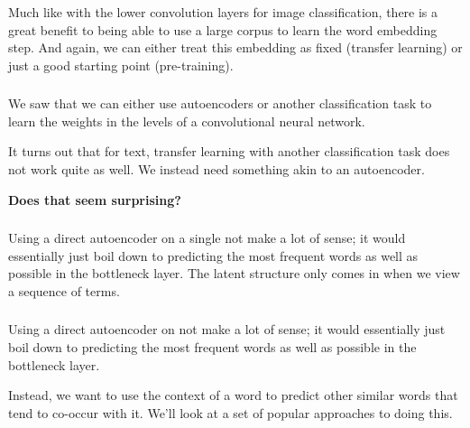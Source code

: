 \documentclass[xetex,mathserif,serif,aspectratio=169]{beamer}
\begin{document}
\begin{frame}[fragile] \frametitle{} \oldB \small


Much like with the lower convolution layers for image classification,
there is a great benefit to being able to use a large corpus to
learn the word embedding step. And again, we can either treat this
embedding as fixed (transfer learning) or just a good starting point
(pre-training).

\end{frame}

\begin{frame}[fragile] \frametitle{} \oldB \small


We saw that we can either use autoencoders or another classification
task to learn the weights in the levels of a convolutional neural
network.

It turns out that for text, transfer learning with another
classification task does not work quite as well. We instead need
something akin to an autoencoder.

\pause \textbf{Does that seem surprising?}

\end{frame}

\begin{frame}[fragile] \frametitle{} \oldB \small


Using a direct autoencoder on a single not make a lot of sense; it would
essentially just boil down to predicting the most frequent words as
well as possible in the bottleneck layer. The latent structure only
comes in when we view a sequence of terms.

\end{frame}

\begin{frame}[fragile] \frametitle{} \oldB \small


Using a direct autoencoder on  not make a lot of sense; it would
essentially just boil down to predicting the most frequent words as
well as possible in the bottleneck layer.

Instead, we want to use the context of a word to predict other similar
words that tend to co-occur with it. We'll look at a set of popular
approaches to doing this.

\end{frame}
\end{document}

